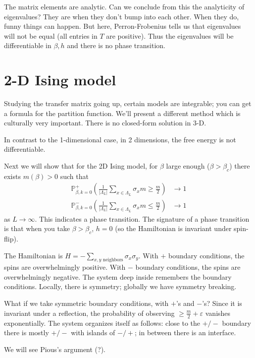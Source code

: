 \documentclass[12pt]{book}
\theoremstyle{norm}
\begin{document}
The matrix elements are analytic. Can we conclude from this the analyticity of eigenvalues? They are when they don't bump into each other. When they do, funny things can happen. But here, Perron-Frobenius tells us that eigenvalues will not be equal (all entries in $T$ are positive). Thus the eigenvalues will be differentiable in $\beta,h$ and there is no phase transition.

\section{2-D Ising model}

Studying the transfer matrix going up, certain models are integrable; you can get a formula for the partition function. We'll present a different method which is culturally very important.
There is no closed-form solution in 3-D.

In contrast to the 1-dimensional case, in 2 dimensions, the free energy is not differentiable. 

Next we will show that for the 2D Ising model, for $\beta$ large enough ($\beta>\beta_c$) there exists $m(\beta)>0$ such that 
\begin{align}
\mathbb{P}_{\beta,k=0}^+\left( {\frac{1}{|\Lambda_L|}\sum_{x\in \Lambda_L} \sigma_x m\ge\frac{m}{2}} \right)&\to 1\\
\mathbb{P}_{\beta,k=0}^-\left( {\frac{1}{|\Lambda_L|}\sum_{x\in \Lambda_L} \sigma_x m\le \frac{m}{2}} \right)&\to 1
\end{align}
as $L\to \infty$. This indicates a phase transition. 
The signature of a phase transition is that when you take $\beta>\beta_c$, $h=0$ (so the Hamiltonian is invariant under spin-flip).

The Hamiltonian is $H=-\sum_{x,y\text{ neighbors}} \sigma_x\sigma_y$.
With $+$ boundary conditions, the spins are overwhelmingly positive. With $-$ boundary conditions, the spins are overwhelmingly negative. The system deep inside remembers the boundary conditions. 
Locally, there is symmetry; globally we have symmetry breaking.

What if we take symmetric boundary conditions, with $+$'s and $-$'s? Since it is invariant under a reflection, the probability of observing $\ge \frac{m}{2}+\varepsilon$ vanishes exponentially. The system organizes itself as follows: close to the $+/-$ boundary there is mostly $+/-$ with islands of $-/+$; in between there is an interface.


We will see Pious's argument (?).


%

%
%

\printnomenclature
\printindex
\end{document}
